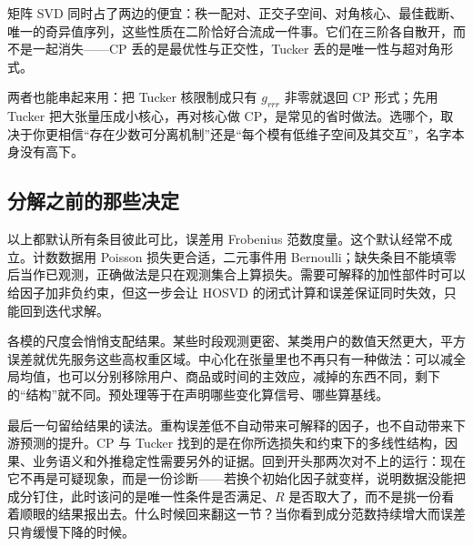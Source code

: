 矩阵 SVD 同时占了两边的便宜：秩一配对、正交子空间、对角核心、最佳截断、唯一的奇异值序列，这些性质在二阶恰好合流成一件事。它们在三阶各自散开，而不是一起消失——CP 丢的是最优性与正交性，Tucker 丢的是唯一性与超对角形式。

两者也能串起来用：把 Tucker 核限制成只有 \(g_{rrr}\) 非零就退回 CP 形式；先用 Tucker 把大张量压成小核心，再对核心做 CP，是常见的省时做法。选哪个，取决于你更相信``存在少数可分离机制''还是``每个模有低维子空间及其交互''，名字本身没有高下。

\subsection{分解之前的那些决定}

以上都默认所有条目彼此可比，误差用 Frobenius 范数度量。这个默认经常不成立。计数数据用 Poisson 损失更合适，二元事件用 Bernoulli；缺失条目不能填零后当作已观测，正确做法是只在观测集合上算损失。需要可解释的加性部件时可以给因子加非负约束，但这一步会让 HOSVD 的闭式计算和误差保证同时失效，只能回到迭代求解。

各模的尺度会悄悄支配结果。某些时段观测更密、某类用户的数值天然更大，平方误差就优先服务这些高权重区域。中心化在张量里也不再只有一种做法：可以减全局均值，也可以分别移除用户、商品或时间的主效应，减掉的东西不同，剩下的``结构''就不同。预处理等于在声明哪些变化算信号、哪些算基线。

最后一句留给结果的读法。重构误差低不自动带来可解释的因子，也不自动带来下游预测的提升。CP 与 Tucker 找到的是在你所选损失和约束下的多线性结构，因果、业务语义和外推稳定性需要另外的证据。回到开头那两次对不上的运行：现在它不再是可疑现象，而是一份诊断——若换个初始化因子就变样，说明数据没能把成分钉住，此时该问的是唯一性条件是否满足、\(R\) 是否取大了，而不是挑一份看着顺眼的结果报出去。什么时候回来翻这一节？当你看到成分范数持续增大而误差只肯缓慢下降的时候。
